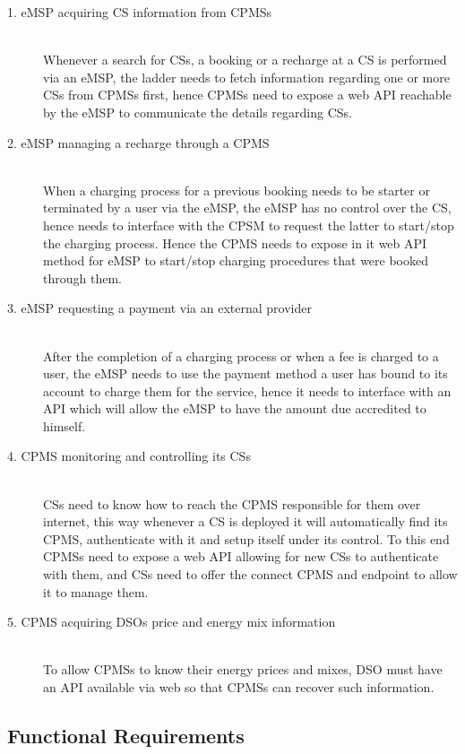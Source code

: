 \documentclass[11pt]{article}
\begin{document}
\begin{description}
    \item [1. eMSP acquiring CS information from CPMSs] \hfill \\
        Whenever a search for CSs, a booking or a recharge at a CS is performed via an eMSP, the ladder needs to fetch information regarding one or more CSs from CPMSs first, hence CPMSs need to expose a web API reachable by the eMSP to communicate the details regarding CSs.
    \item [2. eMSP  managing a recharge through a CPMS] \hfill \\
        When a charging process for a previous booking needs to be starter or terminated by a user via the eMSP, the eMSP has no control over the CS, hence needs to interface with the CPSM to request the latter to start/stop the charging process. Hence the CPMS needs to expose in it web API method for eMSP to start/stop charging procedures that were booked through them.
    \item [3. eMSP requesting a payment via an external provider] \hfill \\
        After the completion of a charging process or when a fee is charged to a user, the eMSP needs to use the payment method a user has bound to its account to charge them for the service, hence it needs to interface with an API which will allow the eMSP to have the amount due accredited to himself.
    \item [4. CPMS monitoring and controlling its CSs] \hfill \\
        CSs need to know how to reach the CPMS responsible for them over internet, this way whenever a CS is deployed it will automatically find its CPMS, authenticate with it and setup itself under its control. To this end CPMSs need to expose a web API allowing for new CSs to authenticate with them, and CSs need to offer the connect CPMS and endpoint to allow it to manage them.
    \item [5. CPMS acquiring DSOs price and energy mix information] \hfill \\
        To allow CPMSs to know their energy prices and mixes, DSO must have an API available via web so that CPMSs can recover such information.
\end{description}

\subsection{Functional Requirements}
\end{document}
